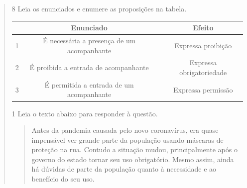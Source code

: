 {\begin{quote}

\num{8} Leia os enunciados e enumere as proposições na tabela.

\begin{table}[]
\begin{tabular}{|c|c|c|c|}
\hline
\rowcolor[HTML]{ECF4FF} 
 & Enunciado &  & Efeito \\ \hline
1 & É necessária a presença de um acompanhante &  & Expressa proibição \\ \hline
2 & É proibida a entrada de acompanhante &  & Expressa obrigatoriedade \\ \hline
3 & É permitida a entrada de um acompanhante &  & Expressa permissão \\ \hline
\end{tabular}
\end{table}





%
%




\num{1} Leia o texto abaixo para responder à questão.

\begin{quote}

Antes da pandemia causada pelo novo coronavírus, era quase impensável
ver grande parte da população usando máscaras de proteção na rua.
Contudo a situação mudou, principalmente após o governo do estado tornar
seu uso obrigatório. Mesmo assim, ainda há dúvidas de parte da população
quanto à necessidade e ao benefício do seu uso.


\end{quote}
\end{quote}}

